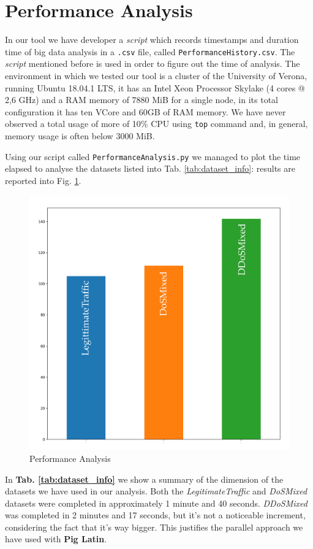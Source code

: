 \section{Performance Analysis}
\label{sec:perfanalysis}
In our tool we have developer a \textit{script} which records timestamps and duration time of big data analysis in a \texttt{.csv} file, called \texttt{PerformanceHistory.csv}. The \textit{script} mentioned before is used in order to figure out the time of analysis. 
The environment in which we tested our tool is a cluster of the University of Verona, running Ubuntu 18.04.1 LTS, it has an Intel Xeon Processor Skylake (4 cores @ 2,6 GHz) and a RAM memory of 7880 MiB for a single node, in its total configuration it has ten VCore and 60GB of RAM memory. 
We have never observed a total usage of more of 10\% CPU using \texttt{top} command and, in general, memory usage is often below 3000 MiB.
 
Using our script called \texttt{PerformanceAnalysis.py} we managed to plot the time elapsed to analyse the datasets listed into Tab. \ref{tab:dataset_info}: results are reported into Fig. \ref{fig:analysis_stats}. 

\begin{figure}[ht]
	\centering
	\includegraphics[scale=0.25]{imgs/analysis_stat.png}
	\caption{Performance Analysis} 
	\label{fig:analysis_stats}
\end{figure}
In \textbf{Tab. \ref{tab:dataset_info}} we show a summary of the dimension of the datasets we have used in our analysis. Both the \textit{LegitimateTraffic} and \textit{DoSMixed} datasets were completed in approximately 1 minute and 40 seconds. \textit{DDoSMixed} was completed in 2 minutes and 17 seconds, but it's not a noticeable increment, considering the fact that it's way bigger. This justifies the parallel approach we have used with \textbf{Pig Latin}.

